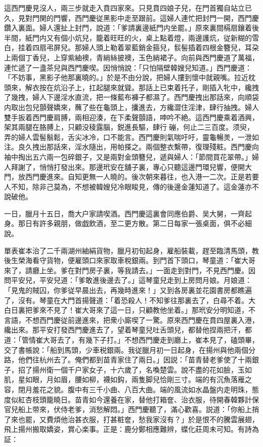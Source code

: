 這西門慶見沒人，兩三步就走入賁四家來。只見賁四娘子兒，在門首獨自站立已久，見對門関的門響，西門慶従黑影中走至跟前。這婦人連忙把封門一開，西門慶鑽入裏面。婦人還扯上封門，說道：「爹請裏邊紙門内坐罷。」原來裏間槅扇鑲着後半間，紙門内又有個小炕兒，籠着旺旺的火，桌上點着燈，兩邊護炕，従新糊的雪白，挂着四扇弔屏兒。那婦人頭上勒着翠藍銷金箍兒，䯼髻插着四根金簪兒，耳朶上兩個丁香兒，上穿紫紬襖，青綃絲披襖，玉色綃裙子。向前與西門慶道了萬福，連忙遞了一盞茶兒與西門慶喫。因悄悄說：「只怕隔壁韓嫂兒知道。」西門慶道：「不妨事，黑影子他那裏曉的。」於是不由分說，把婦人摟到懷中就親嘴。拉近枕頭來，解衣按在炕沿子上，扛起腿來就聳。那話上已束着托子，剛插入牝中，纔拽了幾拽，婦人下邊淫水直流，把一條藍布褲子都濕了。西門慶拽出那話來，向順袋内取出包兒顫聲嬌來，蘸了些在龜頭上，攮進去，方纔澀住淫津，肆行抽拽。婦人雙手扳着西門慶肩膊，兩相迎湊，在下柔聲顫語，呻吟不絶。這西門慶乘着酒興，架其兩腿在胳膊上，只顧没稜露腦，鋭進長驅，肆行𢵞磞，何止二三百度。须臾，弄的婦人雲髻鬅鬆，舌尖冰冷，口不能言。西門慶則氣喘吁吁，靈龜暢羙，一泄如注。良久拽出那話來，淫水隨出，用帕搽之。兩個整衣繫帶，復理殘粧。西門慶向袖中掏出五六兩一包碎銀子，又是兩對金頭簪兒，遞與婦人：「節間買花翠帶。」婦人拜謝了，悄悄打發出來。那邊玳安在舖子裏，專心只聽這邊門環兒響，便開大門，放西門慶進來。自知更無一人曉的。後次朝來暮往，也入港一二次。正是若要人不知，除非己莫為，不想被韓嫂兒冷眼睃見，傳的後邊金蓮知道了。這金蓮亦不說破他。

一日，臘月十五日，喬大户家請喫酒。西門慶這裏會同應伯爵、吴大舅，一齊起身。那日有許多親朋，做戯飲酒，至二更方散。第二日每家一張桌面，俱不必細說。

單表崔本治了二千兩湖州紬絹貨物，臘月初旬起身，雇船裝載，趕至臨清馬頭，教後生榮海看守貨物，便雇頭口來家取車稅銀兩。到門首下頭口，琴童道：「崔大哥來了，請廳上坐。爹在對門房子裏，等我請去。」一面走到對門，不見西門慶。因問平安兒，平安兒道：「爹敢進後邊去了。」這琴童兒走到上房問月娘。月娘道：「見鬼的賊囚，你爹従早晨出去，再幾時進來！」又到各房裏並花園書房都瞧遍了，沒有。琴童在大門首揚聲道：「着恐殺人！不知爹往那裏去了，白尋不着。大白日裏把爹來不見了！崔大哥來了這一日，只顧教他坐着。」那玳安分明知道，不言語，不想西門慶従前邊進來，把衆小廝喫了一驚。原來西門慶在賁四屋裏入港，纔出來。那平安打發西門慶進去了，望着琴童兒吐舌頭兒，都替他捏兩把汗，都道：「管情崔大哥去了，有幾下子打。」不想西門慶走到廳上，崔本見了，磕頭畢，交了書帳說：「船到馬頭，少車税銀兩。我従臘月初一日起身，在揚州與他兩個分路，他們往杭州去了。俺們都到苗青家住了兩日。」因説：「苗青替老爹使了十兩銀子，招了揚州衛一個千户家女子，十六歲了，名喚楚雲。說不盡的花如臉，玉如肌，星如眼，月如眉，腰如柳，襪如鈎，兩隻脚兒恰剛三寸。端的有沉魚落雁之容，閉月羞花之貌。腹中有三千小曲、八百大曲。端的風流如水晶盤内走明珠，態度似紅杏枝頭籠曉日。苗青如今還養在家，替他打箱奩、治衣服，待開春韓夥計保官兒船上带來，伏侍老爹，消愁解悶。」西門慶聽了，滿心歡喜。説道：「你船上捎了來也罷，又費煩他治甚衣服，打甚粧奩，愁我家沒有？」於是恨不的騰雲展翅，飛上揚州搬取嬌姿，賞心楽事。正是：鹿分鄭相應難辨，蝶化莊周未可知。有詩為証：

